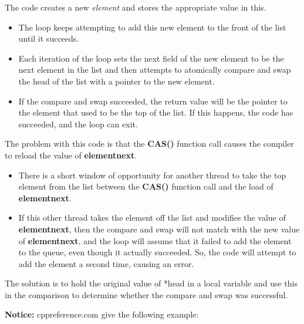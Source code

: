 \documentclass[12pt,a4paper]{report}
\begin{document}
The code creates a new \textit{element} and stores the appropriate value in this. 
\begin{itemize}
	\item The loop keeps attempting to add this new element to the front of the list until it succeeds. 
	\item Each iteration of the loop sets the next field of the new element to be the next element in the list and then attempts to atomically compare and swap the head of the list with a pointer to the new element. 
	\item If the compare and swap succeeded, the return value will be the pointer to the element that used to be the top of the list. If this happens, the code has succeeded, and the loop can exit.
\end{itemize}
The problem with this code is that the \textbf{CAS()} function call causes the compiler to reload the value of \textbf{element\textrightarrow next}. 
\begin{itemize}
	\item There is a short window of opportunity for another thread to take the top element from the list between the \textbf{CAS()} function call and the load of \textbf{element\textrightarrow next}. 
	\item If this other thread takes the element off the list and modifies the value of \textbf{element\textrightarrow next}, then the compare and swap will not match with the new value of \textbf{element\textrightarrow next}, and the loop will assume that it failed to add the element to the queue, even though it actually succeeded. So, the code will attempt to add the element a second time, causing an error.
\end{itemize}
The solution is to hold the original value of *head in a local variable and use this in the comparison to determine whether the compare and swap was successful. 
\par
\textbf{Notice:}
cppreference.com give the following example:
\end{document}

